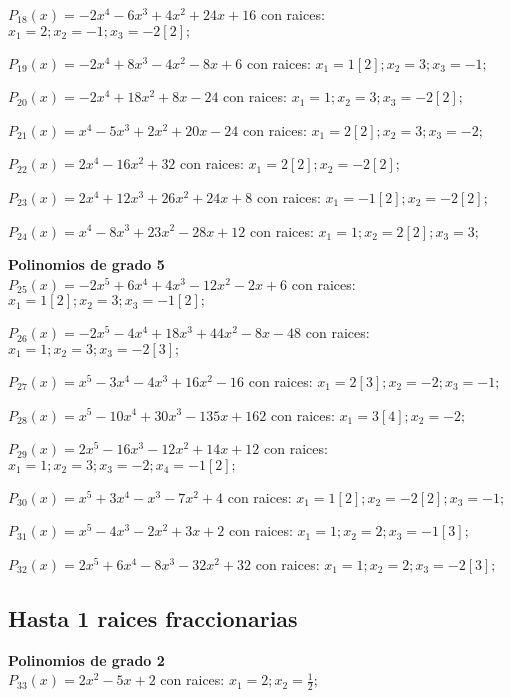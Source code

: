 \subitem $P_{18}(x) = -2x^4 - 6x^3 + 4x^2 + 24x + 16$ con raices: $x_1 = 2 ; x_2 = -1 ; x_3 = -2[2] ;  $

\subitem $P_{19}(x) = -2x^4 + 8x^3 - 4x^2 - 8x + 6$ con raices: $x_1 = 1[2] ; x_2 = 3 ; x_3 = -1 ;  $

\subitem $P_{20}(x) = -2x^4 + 18x^2 + 8x - 24$ con raices: $x_1 = 1 ; x_2 = 3 ; x_3 = -2[2] ;  $

\subitem $P_{21}(x) = x^4 - 5x^3 + 2x^2 + 20x - 24$ con raices: $x_1 = 2[2] ; x_2 = 3 ; x_3 = -2 ;  $

\subitem $P_{22}(x) = 2x^4 - 16x^2 + 32$ con raices: $x_1 = 2[2] ; x_2 = -2[2] ;  $

\subitem $P_{23}(x) = 2x^4 + 12x^3 + 26x^2 + 24x + 8$ con raices: $x_1 = -1[2] ; x_2 = -2[2] ;  $

\subitem $P_{24}(x) = x^4 - 8x^3 + 23x^2 - 28x + 12$ con raices: $x_1 = 1 ; x_2 = 2[2] ; x_3 = 3 ;  $

\textbf{Polinomios de grado 5\\} 
\subitem $P_{25}(x) = -2x^5 + 6x^4 + 4x^3 - 12x^2 - 2x + 6$ con raices: $x_1 = 1[2] ; x_2 = 3 ; x_3 = -1[2] ;  $

\subitem $P_{26}(x) = -2x^5 - 4x^4 + 18x^3 + 44x^2 - 8x - 48$ con raices: $x_1 = 1 ; x_2 = 3 ; x_3 = -2[3] ;  $

\subitem $P_{27}(x) = x^5 - 3x^4 - 4x^3 + 16x^2 - 16$ con raices: $x_1 = 2[3] ; x_2 = -2 ; x_3 = -1 ;  $

\subitem $P_{28}(x) = x^5 - 10x^4 + 30x^3 - 135x + 162$ con raices: $x_1 = 3[4] ; x_2 = -2 ;  $

\subitem $P_{29}(x) = 2x^5 - 16x^3 - 12x^2 + 14x + 12$ con raices: $x_1 = 1 ; x_2 = 3 ; x_3 = -2 ; x_4 = -1[2] ;  $

\subitem $P_{30}(x) = x^5 + 3x^4 - x^3 - 7x^2 + 4$ con raices: $x_1 = 1[2] ; x_2 = -2[2] ; x_3 = -1 ;  $

\subitem $P_{31}(x) = x^5 - 4x^3 - 2x^2 + 3x + 2$ con raices: $x_1 = 1 ; x_2 = 2 ; x_3 = -1[3] ;  $

\subitem $P_{32}(x) = 2x^5 + 6x^4 - 8x^3 - 32x^2 + 32$ con raices: $x_1 = 1 ; x_2 = 2 ; x_3 = -2[3] ;  $

\subsection{Hasta 1 raices fraccionarias}
\textbf{Polinomios de grado 2\\} 
\subitem $P_{33}(x) = 2x^2 - 5x + 2$ con raices: $x_1 = 2 ; x_2 = \frac{1}{2} ;  $

